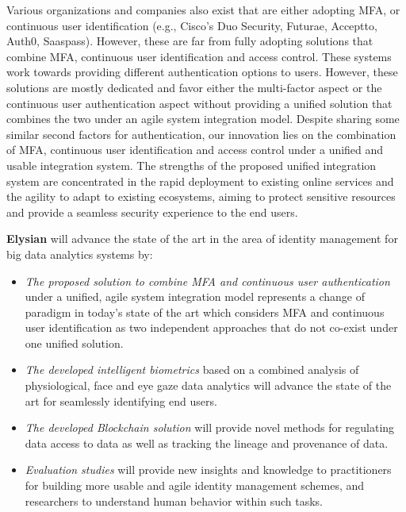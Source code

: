 \documentclass[a4paper,11pt]{article}
\newcommand{\project}[1]{\textbf{#1}\xspace}
\newcommand{\SECURITY}{\project{Elysian}}
\newcommand{\TheProject}{\SECURITY}
\begin{document}
Various organizations and companies also exist that are either adopting MFA, or continuous user identification (e.g., Cisco’s Duo Security, Futurae, Acceptto, Auth0, Saaspass). However, these are far from fully adopting solutions that combine MFA, continuous user identification and access control. These systems work towards providing different authentication options to users. However, these solutions are mostly dedicated and favor either the multi-factor aspect or the continuous user authentication aspect without providing a unified solution that combines the two under an agile system integration model. Despite sharing some similar second factors for authentication, our innovation lies on the combination of MFA, continuous user identification and access control under a unified and usable integration system. The strengths of the proposed unified integration system are concentrated in the rapid deployment to existing online services and the agility to adapt to existing ecosystems, aiming to protect sensitive resources and provide a seamless security experience to the end users.

\begin{mdframed}[backgroundcolor=gray!10]
\TheProject{} will advance the state of the art in the area of identity management for big data analytics systems by:
\begin{itemize}
\item \emph{The proposed solution to combine MFA and continuous user authentication} under a unified, agile system integration model represents a change of paradigm in today’s state of the art which considers MFA and continuous user identification as two independent approaches that do not co-exist under one unified solution.
\item \emph{The developed intelligent biometrics} based on a combined analysis of physiological, face and eye gaze data analytics will advance the state of the art for seamlessly identifying end users.
\item \emph{The developed Blockchain solution} will provide novel methods for regulating data access to data as well as tracking the lineage and provenance of data. 
\item \emph{Evaluation studies} will provide new insights and knowledge to practitioners for building more usable and agile identity management schemes, and researchers to understand human behavior within such tasks.
\end{itemize}
\end{mdframed}
\end{document}

